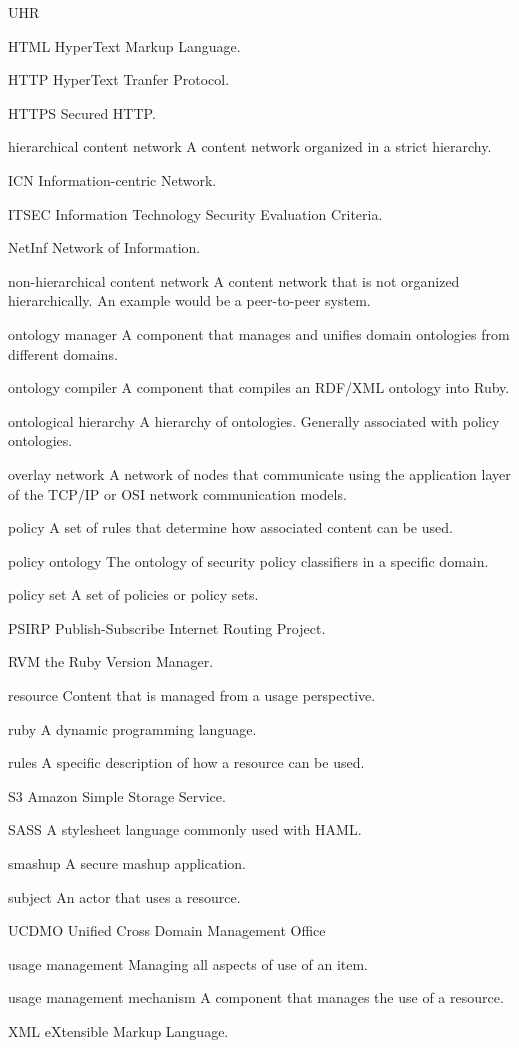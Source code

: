 \documentclass[botnum,fleqn,final]{unmeethesis}
\begin{document}
\begin{glossary}{UHR}
\item[HTML] HyperText Markup Language.
\item[HTTP] HyperText Tranfer Protocol.
\item[HTTPS] Secured HTTP.
\item[hierarchical content network] A content network organized in a strict hierarchy.
\item[ICN] Information-centric Network.
\item[ITSEC] Information Technology Security Evaluation Criteria.
\item[NetInf] Network of Information.
\item[non-hierarchical content network] A content network that is not organized hierarchically.  An example would be a peer-to-peer system.
\item[ontology manager] A component that manages and unifies domain ontologies from different domains.
\item[ontology compiler] A component that compiles an RDF/XML ontology into Ruby.
\item[ontological hierarchy] A hierarchy of ontologies.  Generally associated with policy ontologies.
\item[overlay network] A network of nodes that communicate using the application layer of the TCP/IP or OSI network communication models.
\item[policy] A set of rules that determine how associated content can be used.
\item[policy ontology] The ontology of security policy classifiers in a specific domain.
\item[policy set] A set of policies or policy sets.
\item[PSIRP] Publish-Subscribe Internet Routing Project.
\item[RVM] the Ruby Version Manager.
\item[resource] Content that is managed from a usage perspective.
\item[ruby] A dynamic programming language.
\item[rules] A specific description of how a resource can be used.
\item[S3] Amazon Simple Storage Service.
\item[SASS] A stylesheet language commonly used with HAML.
\item[smashup] A secure mashup application.
\item[subject] An actor that uses a resource.
\item[UCDMO] Unified Cross Domain Management Office
\item[usage management] Managing all aspects of use of an item.
\item[usage management mechanism] A component that manages the use of a resource.
\item[XML] eXtensible Markup Language.
\end{glossary}
\end{document}
